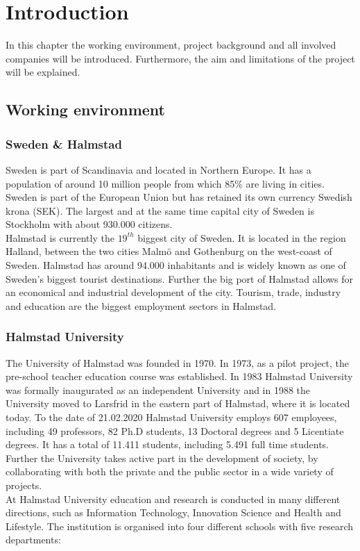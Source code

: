 \chapter{Introduction}
\label{introduction}
In this chapter the working environment, project background and all involved companies will be introduced. Furthermore, the aim and limitations of the project will be explained.

\section{Working environment}

\subsection{Sweden \& Halmstad}
Sweden is part of Scandinavia and located in Northern Europe. It has a population of around 10 million people from which 85\% are living in cities. Sweden is part of the European Union but has retained its own currency Swedish krona (SEK). The largest and at the same time capital city of Sweden is Stockholm with about 930.000 citizens.\\

Halmstad is currently the $19^{th}$ biggest city of Sweden. It is located in the region Halland, between the two cities Malmö and Gothenburg on the west-coast of Sweden. Halmstad has around 94.000 inhabitants and is widely known as one of Sweden's biggest tourist destinations. Further the big port of Halmstad allows for an economical and industrial development of the city. Tourism, trade, industry and education are the biggest employment sectors in Halmstad.\cite{Halmstad} 

\subsection{Halmstad University}
The University of Halmstad was founded in 1970. In 1973, as a pilot project, the pre-school teacher education course was established. In 1983 Halmstad University was formally inaugurated as an independent University and in 1988 the University moved to Larsfrid in the eastern part of Halmstad, where it is located today.
To the date of 21.02.2020 Halmstad University employs 607 employees, including 49 professors, 82 Ph.D students, 13 Doctoral degrees and 5 Licentiate degrees. It has a total of 11.411 students, including 5.491 full time students. Further the University takes active part in the development of society, by collaborating with both the private and the public sector in a wide variety of projects.\cite{FactsAboutHalmstadUniversity}\cite{HalmstadUniversityInNumbers}\\
At Halmstad University education and research is conducted in many different directions, such as Information Technology, Innovation Science and Health and Lifestyle. The institution is organised into four different schools with five research departments:

